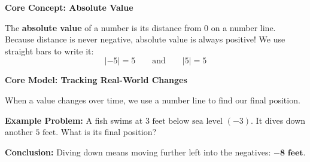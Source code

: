 \documentclass[12pt, letterpaper, fleqn]{article}
\begin{document}
\begin{tcolorbox}[colback=white, colframe=black!25, boxrule=0.6pt, arc=4mm, left=6mm, right=6mm, top=4mm, bottom=4mm]
\textbf{Core Concept: Absolute Value}

\noindent
The \textbf{absolute value} of a number is its distance from $0$ on a number line. Because distance is never negative, absolute value is always positive! We use straight bars to write it:
$$|-5| = 5 \qquad \text{and} \qquad |5| = 5$$
\end{tcolorbox}

\vspace{4mm}

\begin{tcolorbox}[colback=white, colframe=black!25, boxrule=0.6pt, arc=4mm, left=6mm, right=6mm, top=4mm, bottom=4mm]
\textbf{Core Model: Tracking Real-World Changes}

\medskip
When a value changes over time, we use a number line to find our final position. 

\medskip
\textbf{Example Problem:} A fish swims at $3\text{ feet below sea level } (-3)$. It dives down another $5\text{ feet}$. What is its final position?

\begin{center}
\end{center}

\noindent
\textbf{Conclusion:} Diving down means moving further left into the negatives: $\mathbf{-8\text{ feet}}$.
\end{tcolorbox}

\vspace{4mm}

\vspace{2mm}
\end{document}
